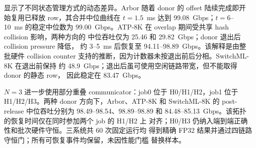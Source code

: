  显示了不同状态管理方式的动态差异。Arbor
随着 donor 的 offset 陆续完成即开始复用已释放 row，其合并中位曲线在
$t=1.5$~ms 达到 99.08~Gbps；$t=6$--10~ms 的稳定中位数为
99.00~Gbps。ATP-8K 在 overlap 期间受共享 hash collision 影响，两种方向的
中位吞吐仅为 25.46 和 29.82~Gbps；donor 退出后 collision pressure 降低，
约 3--5~ms 后恢复至 94.11--98.89~Gbps。该解释是由整批硬件 collision
counter 支持的推断，因为计数器未按退出前后分相。SwitchML-8K 在退出前保持
约 48.9~Gbps；退出后虽可使用空闲链路带宽，但不能取得 donor 的静态 row，
因此稳定在 83.47~Gbps。

$N=3$ 进一步使用部分重叠 communicator：job0 位于 H0/H1/H2，job1 位于
H1/H2/H3。两种 donor 方向下，Arbor、ATP-8K 和 SwitchML-8K 的
post-release 中位吞吐分别为 98.49--98.54、98.89--98.89 和
84.48--85.13~Gbps。该拓扑的恢复时间仅在同时参加两个 job 的 H1/H2 上
对齐；H0/H3 仍纳入端到端正确性和批次硬件守恒。三系统共 60 次固定运行均
得到精确 FP32 结果并通过四链路守恒门；所有可恢复事件均保留，未因性能门槛
替换样本。

\begin{table}[t]
\centering
\small
\caption{三个最终 routed V80 protocol core 的主要资源分解。共有必要
数据面合并 FP32 运算与聚合状态访问；各系统必要区域汇总 top 与 bank/slot
的 direct cells。完整 core 行括号内为 V80 总资源占比；组件行不构成
完整的可加分解。}
\label{tab:physical-resources}
\setlength{\tabcolsep}{5pt}
\end{table}

